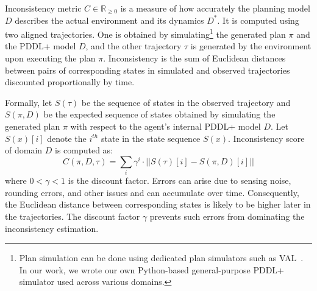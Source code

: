 \documentclass[letterpaper]{article} %
\begin{document}
Inconsistency metric $C \in \mathbb{R}_{\ge 0}$ is a measure of how accurately the planning model $D$ describes the actual environment and its dynamics $D^*$. It is computed using two aligned trajectories. One is obtained by simulating\footnote{Plan simulation can be done using dedicated plan simulators such as VAL~\cite{howey2004val}. In our work, we wrote our own Python-based general-purpose PDDL+ simulator used across various domains.} the generated plan $\pi$ and the PDDL+ model $D$, and the other trajectory $\tau$ is generated by the environment upon executing the plan $\pi$. Inconsistency is the sum of Euclidean distances between pairs of corresponding states in simulated and observed trajectories discounted proportionally by time. 


Formally, let $S(\tau)$ be the sequence of states in the observed trajectory and $S(\pi,D)$ be the expected sequence of states obtained by simulating the generated plan $\pi$ with respect to the agent's internal PDDL+ model $D$. Let $S(x)[i]$ denote the $i^{th}$ state in the state sequence $S(x)$. Inconsistency score of domain $D$ is computed as:
\begin{equation}
    C(\pi, D, \tau) = \sum_{i} \gamma^i\cdot ||S(\tau)[i] - S(\pi,D)[i]||
\end{equation}
where $0<\gamma<1$ is the discount factor. Errors can arise due to sensing noise, rounding errors, and other issues and can accumulate over time. Consequently, the Euclidean distance between corresponding states is likely to be higher later in the trajectories. The discount factor $\gamma$ prevents such errors from dominating the inconsistency estimation.  
\end{document}
